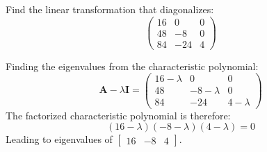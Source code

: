 Find the linear transformation that diagonalizes:
\begin{equation*}
	\begin{pmatrix}
		16&0&0\\48&-8&0\\84&-24&4
	\end{pmatrix}
\end{equation*}

Finding the eigenvalues from the characteristic polynomial:
\begin{equation*}
	\boldsymbol{A}-\lambda\boldsymbol{I}=
		\begin{pmatrix}
		16-\lambda&0&0\\48&-8-\lambda&0\\84&-24&4-\lambda
	\end{pmatrix}
\end{equation*}
The factorized characteristic polynomial is therefore:
\begin{equation*}
	\left(16-\lambda\right)\left(-8-\lambda\right)\left(4-\lambda\right)=0
\end{equation*}
Leading to eigenvalues of $\begin{bmatrix} 16&-8&4\end{bmatrix}$.

